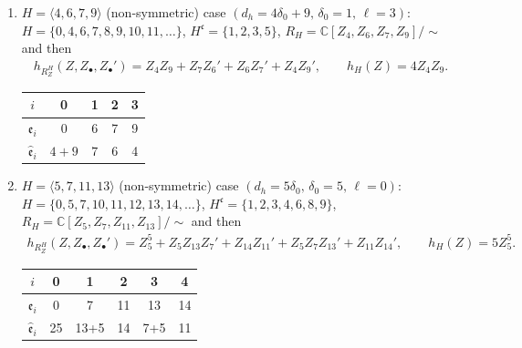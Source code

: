 \documentclass[pdftex]{sigma}
\def\CC{{\mathbb C}}
\def\fc{{\mathfrak c}}
\def\fe{{\mathfrak e}}
\def\hfe{{\widehat{\mathfrak e}}}
\numberwithin{equation}{section}
\begin{document}
\begin{Example}\quad
\begin{enumerate}\itemsep=0pt

\item $H=\langle 4, 6, 7, 9\rangle$ (non-symmetric) case $(d_h=4\delta_0+9,\, \delta_0=1,\, \ell=3)$:
$H = \{0, 4, 6, 7, 8, 9, 10, \allowbreak 11, \dots\}$, $H^\fc = \{1, 2, 3, 5\}$,
$R_H = \CC[Z_4, Z_6, Z_{7}, Z_{9}]/{\sim} $ and then
\begin{gather*}
h_{{R_Z^H}}(Z, Z_\bullet, Z_\bullet') =
Z_4Z_9 + Z_{7} Z_{6}'+Z_6 Z_{7}'+ Z_4 Z_9',
\qquad
h_H(Z) = 4 Z_4Z_9.
\end{gather*}
\begin{table}[htb]\centering\vspace{-5mm}
 \begin{tabular}{|c|cccc|}
\hline
$i$&0&1&2&3\\
\hline
$\fe_i $ &0 &6 & 7& 9 \\
$\hfe_i$ &$4+9$ &$7$ & $6$& 4 \\
\hline
 \end{tabular}
\end{table}\label{2tb:Ex50}

\item $H=\langle 5, 7, 11, 13\rangle$ (non-symmetric) case $(d_h=5 \delta_0,\, \delta_0=5, \, \ell=0)$:
$H = \{0, 5, 7, 10, 11, 12,\allowbreak 13, 14, \dots\}$, $H^\fc = \{1, 2, 3, 4, 6, 8, 9\}$,
$R_H = \CC[Z_5, Z_7, Z_{11}, Z_{13}]/ {\sim} $ and then
\begin{gather*}
h_{{R_Z^H}}(Z, Z_\bullet, Z_\bullet') =
Z_5^5 + Z_5 Z_{13} Z_7'+ Z_{14} Z_{11}'+Z_5 Z_7 Z_{13}'+Z_{11} Z_{14}',
\qquad
h_H(Z) = 5 Z_5^5.
\end{gather*}
\begin{table}[htb]\centering\vspace{-5mm}
 \begin{tabular}{|c|ccccc|}
\hline
$i$&0&1&2&3&4\\
\hline
$\fe_i $ &0 &7 & 11& 13 &14 \\
$\hfe_i$ &25 &13+5 & 14& 7+5 &11 \\
\hline
 \end{tabular}
\end{table}\label{2tb:Ex5}



\end{enumerate}
\end{Example}
\end{document}
